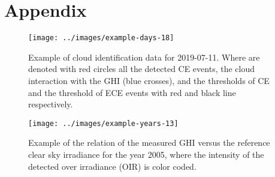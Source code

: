 \documentclass[preprint, 5p,
authoryear]{elsarticle} %
\begin{document}
\hypertarget{appendix}{%
\section*{Appendix}\label{appendix}}

\begin{figure}[H]

{\centering \texttt{[image: ../images/example-days-18]} 

}

\caption{Example of cloud identification data for 2019-07-11. Where are denoted with red circles all the detected CE events, the cloud interaction with the GHI (blue crosses), and the thresholds of CE and the threshold of ECE events with red and black line respectively.}\label{fig:example-day}
\end{figure}

\begin{figure}[H]

{\centering \texttt{[image: ../images/example-years-13]} 

}

\caption{Example of the relation of the measured GHI versus the reference clear sky irradiance for the year 2005, where the intensity of the detected over irradiance (OIR) is color coded.}\label{fig:example-year}
\end{figure}


\end{document}
